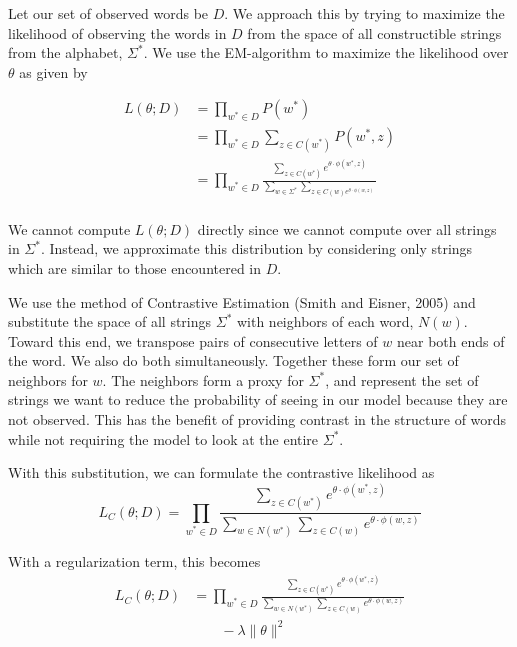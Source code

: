 \documentclass[11pt,twocolumn]{article}
\begin{document}
Let our set of observed words be $D$. We approach this by trying to maximize the likelihood of observing the words in $D$ from the space of all constructible strings from the alphabet, $\Sigma^*$. We use the EM-algorithm to maximize the likelihood over $\theta$ as given by

\begin{equation}
    \begin{split}
        L(\theta; D) &= \prod_{w^*\in D} P(w^*) \\
        &= \prod_{w^*\in D} \sum_{z\in C(w^*)} P(w^*, z) \\
        &= \prod_{w^*\in D} \frac{\sum_{z\in C(w^*)} e^{\theta\cdot\phi(w^*,z)}} {\sum_{w\in\Sigma^*}\sum_{z\in C(w) e^{\theta\cdot\phi(w,z)}}} \\
    \end{split}
\end{equation}

We cannot compute $L(\theta; D)$ directly since we cannot compute over all strings in $\Sigma^*$. Instead, we approximate this distribution by considering only strings which are similar to those encountered in $D$.

We use the method of Contrastive Estimation (Smith and Eisner, 2005) and substitute the space of all strings $\Sigma^*$ with neighbors of each word, $N(w)$. Toward this end, we transpose pairs of consecutive letters of $w$ near both ends of the word. We also do both simultaneously. Together these form our set of neighbors for $w$. The neighbors form a proxy for $\Sigma^*$, and represent the set of strings we want to reduce the probability of seeing in our model because they are not observed. This has the benefit of providing contrast in the structure of words while not requiring the model to look at the entire $\Sigma^*$.

With this substitution, we can formulate the contrastive likelihood as
\begin{equation}
    L_C(\theta; D) = \prod_{w^*\in D} \frac{\sum_{z\in C(w^*)} e^{\theta\cdot\phi(w^*,z)}} {\sum_{w\in N(w^*)} \sum_{z\in C(w)} e^{\theta\cdot\phi(w,z)}}
\end{equation}

With a regularization term, this becomes
\begin{equation}
    \begin{split}
        L_C(\theta; D) &= \prod_{w^*\in D} \frac{\sum_{z\in C(w^*)} e^{\theta\cdot\phi(w^*,z)}} {\sum_{w\in N(w^*)} \sum_{z\in C(w)} e^{\theta\cdot\phi(w,z)}} \\
        &\qquad - \lambda \|\theta\|^2
    \end{split}
\end{equation}
\end{document}
